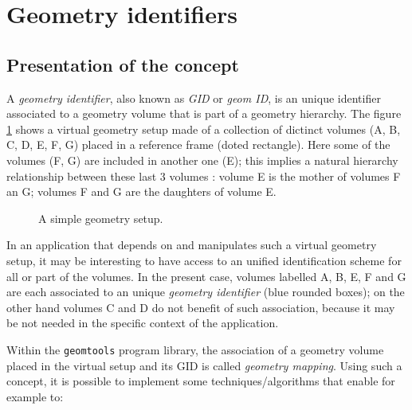 
\section{Geometry identifiers}

\subsection{Presentation of the concept}

\pn A \emph{geometry  identifier}, also known as  \emph{GID} or \emph{geom
  ID}, is an unique identifier associated to a geometry volume that is
part of a  geometry hierarchy. The figure \ref{fig:0}  shows a virtual
geometry setup made  of a collection of dictinct volumes  (A, B, C, D,
E, F, G) placed in a  reference frame (doted rectangle).  Here some of
the volumes  (F, G) are  included in another  one (E); this  implies a
natural hierarchy relationship between these last 3 volumes : volume E
is the mother of volumes F an  G; volumes F and G are the daughters of
volume E.

\begin{figure}[h]
\begin{center}
\scalebox{0.75}{}
\end{center}
\caption{A simple geometry setup.}\label{fig:0}
\end{figure}

\pn In  an application  that depends  on  and manipulates  such a  virtual
geometry setup,  it may  be interesting to  have access to  an unified
identification scheme for all or  part of the volumes.  In the present
case, volumes  labelled A,  B, E, F  and G  are each associated  to an
unique \emph{geometry identifier} (blue rounded boxes);  
on the other hand volumes  C and D
do not  benefit of  such association,  because it may be  not needed  
in the specific context of the application.

\pn Within the  \texttt{geomtools} program  library, the association  of a
geometry  volume placed in  the virtual  setup and  its GID  is called
\emph{geometry  mapping}.   Using such  a  concept,  it is  possible to
implement some techniques/algorithms that enable for example to:

